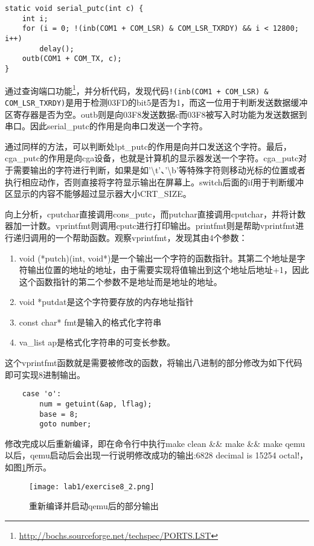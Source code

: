 \begin{exerciseSolution}{8}
\begin{lstlisting}
static void serial_putc(int c) {
    int i;
    for (i = 0; !(inb(COM1 + COM_LSR) & COM_LSR_TXRDY) && i < 12800; i++)
        delay();
    outb(COM1 + COM_TX, c);
}
\end{lstlisting}
\par 通过查询端口功能\footnote{\url{http://bochs.sourceforge.net/techspec/PORTS.LST}}，并分析代码，发现代码\lstinline{!(inb(COM1 + COM_LSR) & COM_LSR_TXRDY)}是用于检测03FD的bit5是否为1，而这一位用于判断发送数据缓冲区寄存器是否为空。outb则是向03F8发送数据c而03F8被写入时功能为发送数据到串口。因此serial\_putc的作用是向串口发送一个字符。
\par 通过同样的方法，可以判断处lpt\_putc的作用是向并口发送这个字符。最后，cga\_putc的作用是向cga设备，也就是计算机的显示器发送一个字符。cga\_putc对于需要输出的字符进行判断，如果是如'\textbackslash t'、'\textbackslash b'等特殊字符则移动光标的位置或者执行相应动作，否则直接将字符显示输出在屏幕上。switch后面的if用于判断缓冲区显示的内容不能够超过显示器大小CRT\_SIZE。
\par 向上分析，cputchar直接调用cons\_putc，而putchar直接调用cputchar，并将计数器加一计数。vprintfmt则调用cputc进行打印输出。printfmt则是帮助vprintfmt进行递归调用的一个帮助函数。观察vprintfmt，发现其由4个参数：
\begin{enumerate}
    \item void (*putch)(int, void*)是一个输出一个字符的函数指针。其第二个地址是字符输出位置的地址的地址，由于需要实现将值输出到这个地址后地址+1，因此这个函数指针的第二个参数不是地址而是地址的地址。
    \item void *putdat是这个字符要存放的内存地址指针
    \item const char* fmt是输入的格式化字符串
    \item va\_list ap是格式化字符串的可变长参数。
\end{enumerate}
\par 这个vprintfmt函数就是需要被修改的函数，将输出八进制的部分修改为如下代码即可实现8进制输出。
\begin{lstlisting}
    case 'o':
        num = getuint(&ap, lflag);
        base = 8;
        goto number;
\end{lstlisting}
\par 修改完成以后重新编译，即在命令行中执行make clean \&\& make \&\& make qemu以后，qemu启动后会出现一行说明修改成功的输出:6828 decimal is 15254 octal!，如图\ref{fig:exercise8_2}所示。
\begin{figure}[htb]
    \centering
    \texttt{[image: lab1/exercise8\_2.png]}
    \caption{重新编译并启动qemu后的部分输出}
    \label{fig:exercise8_2}
\end{figure}

\FloatBarrier
\end{exerciseSolution}

